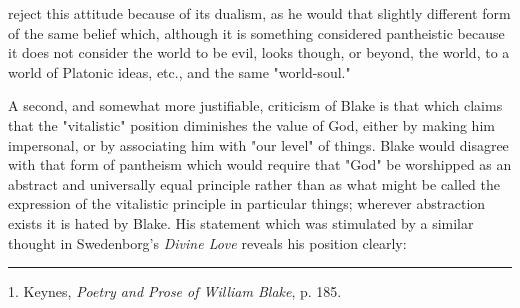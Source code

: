 reject this attitude because of its dualism, as he would that slightly different form of the same belief which, although
it is something considered pantheistic because it does not consider the world to be evil, looks though, or beyond,
the world, to a world of Platonic ideas, etc., and the same "world-soul."\par
\vspace*{0.5\baselineskip}
A second, and somewhat more justifiable, criticism of Blake is that which claims that the "vitalistic" position diminishes
the value of God, either by making him impersonal, or by associating him with "our level" of things. Blake would
disagree with that form of pantheism which would require that "God" be worshipped as an abstract and universally equal principle
rather than as what might be called the expression of the vitalistic principle in particular
things; wherever abstraction exists it is hated by Blake. His statement which was stimulated by a similar thought in
Swedenborg's \textit{Divine Love} reveals his position clearly:\par
\vspace*{\fill}
\noindent\rule{0.25\textwidth}{0.4pt}\par
1. Keynes, \textit{Poetry and Prose of William Blake}, p. 185.\par

\newpage

